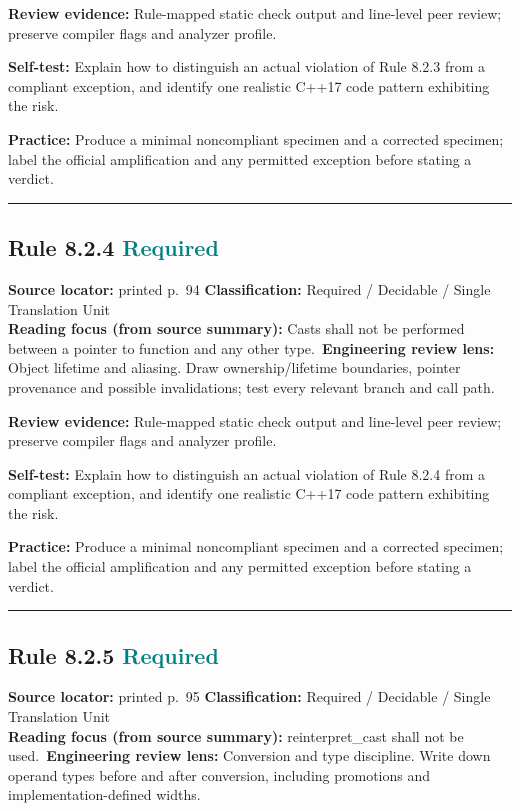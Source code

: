 \documentclass[10pt,letterpaper]{article}
\begin{document}
\textbf{Review evidence:} Rule-mapped static check output and line-level peer review; preserve compiler flags and analyzer profile.

\textbf{Self-test:} Explain how to distinguish an actual violation of Rule 8.2.3 from a compliant exception, and identify one realistic C++17 code pattern exhibiting the risk.\par
\textbf{Practice:} Produce a minimal noncompliant specimen and a corrected specimen; label the official amplification and any permitted exception before stating a verdict.
\smallskip\hrule\smallskip
\subsection*{Rule 8.2.4 \enspace \texorpdfstring{\small\textcolor{teal}{Required}}{Required}}
\noindent\textbf{Source locator:} printed p.~94 \quad\textbf{Classification:} Required / Decidable / Single Translation Unit\\
\textbf{Reading focus (from source summary):} Casts shall not be performed between a pointer to function and any other type.\
\textbf{Engineering review lens:} Object lifetime and aliasing. Draw ownership/lifetime boundaries, pointer provenance and possible invalidations; test every relevant branch and call path.

\textbf{Review evidence:} Rule-mapped static check output and line-level peer review; preserve compiler flags and analyzer profile.

\textbf{Self-test:} Explain how to distinguish an actual violation of Rule 8.2.4 from a compliant exception, and identify one realistic C++17 code pattern exhibiting the risk.\par
\textbf{Practice:} Produce a minimal noncompliant specimen and a corrected specimen; label the official amplification and any permitted exception before stating a verdict.
\smallskip\hrule\smallskip
\subsection*{Rule 8.2.5 \enspace \texorpdfstring{\small\textcolor{teal}{Required}}{Required}}
\noindent\textbf{Source locator:} printed p.~95 \quad\textbf{Classification:} Required / Decidable / Single Translation Unit\\
\textbf{Reading focus (from source summary):} reinterpret\_cast shall not be used.\
\textbf{Engineering review lens:} Conversion and type discipline. Write down operand types before and after conversion, including promotions and implementation-defined widths.
\end{document}
